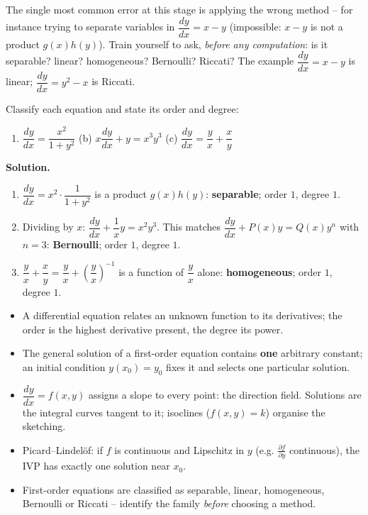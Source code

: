 \documentclass[11pt]{article}
\newcommand{\cle}[1]{{\popxbold\color{popdark}#1}}
\begin{document}
\begin{attention}
The single most common error at this stage is applying the wrong method -- for instance trying to separate variables in $\dfrac{dy}{dx} = x - y$ (impossible: $x - y$ is not a product $g(x)h(y)$). Train yourself to ask, \emph{before any computation}: is it separable? linear? homogeneous? Bernoulli? Riccati? The example $\dfrac{dy}{dx} = x - y$ is linear; $\dfrac{dy}{dx} = y^2 - x$ is Riccati.
\end{attention}

\begin{exoresolu}
Classify each equation and state its order and degree:
\begin{enumerate}
\item $\dfrac{dy}{dx} = \dfrac{x^2}{1 + y^2}$ \qquad (b)\; $x\dfrac{dy}{dx} + y = x^3 y^3$ \qquad (c)\; $\dfrac{dy}{dx} = \dfrac{y}{x} + \dfrac{x}{y}$
\end{enumerate}
\tcblower
\textbf{Solution.}
\begin{enumerate}
\item $\dfrac{dy}{dx} = x^2 \cdot \dfrac{1}{1+y^2}$ is a product $g(x)h(y)$: \textbf{separable}; order $1$, degree $1$.
\item Dividing by $x$: $\dfrac{dy}{dx} + \dfrac{1}{x}y = x^2 y^3$. This matches $\dfrac{dy}{dx} + P(x)y = Q(x)y^n$ with $n = 3$: \textbf{Bernoulli}; order $1$, degree $1$.
\item $\dfrac{y}{x} + \dfrac{x}{y} = \dfrac{y}{x} + \left(\dfrac{y}{x}\right)^{-1}$ is a function of $\dfrac{y}{x}$ alone: \textbf{homogeneous}; order $1$, degree $1$.
\end{enumerate}
\end{exoresolu}

\begin{aretenir}
\begin{itemize}
\item A differential equation relates an unknown function to its derivatives; the \cle{order} is the highest derivative present, the \cle{degree} its power.
\item The general solution of a first-order equation contains \textbf{one} arbitrary constant; an initial condition $y(x_0)=y_0$ fixes it and selects one particular solution.
\item $\dfrac{dy}{dx} = f(x,y)$ assigns a slope to every point: the \cle{direction field}. Solutions are the \cle{integral curves} tangent to it; \cle{isoclines} ($f(x,y)=k$) organise the sketching.
\item Picard--Lindel\"of: if $f$ is continuous and Lipschitz in $y$ (e.g. $\frac{\partial f}{\partial y}$ continuous), the IVP has exactly one solution near $x_0$.
\item First-order equations are classified as separable, linear, homogeneous, Bernoulli or Riccati -- identify the family \emph{before} choosing a method.
\end{itemize}
\end{aretenir}
\end{document}
